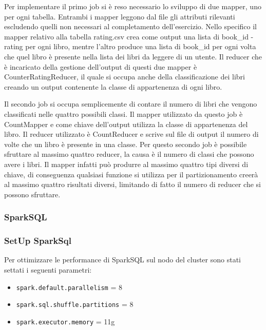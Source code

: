 Per implementare il primo job si è reso necessario lo sviluppo di due mapper, uno per ogni tabella.
Entrambi i mapper leggono dal file gli attributi rilevanti escludendo quelli non necessari al completamento dell'esercizio.
Nello specifico il mapper relativo alla tabella rating.csv crea come output una lista di book\_id - rating per ogni libro, mentre l'altro
produce una lista di book\_id per ogni volta che quel libro è presente nella lista dei libri da leggere di un utente.
Il reducer che è incaricato della gestione dell'output di questi due mapper è CounterRatingReducer, il quale si occupa anche della classificazione dei
libri creando un output contenente la classe di appartenenza di ogni libro.

Il secondo job si occupa semplicemente di contare il numero di libri che vengono classificati nelle quattro possibili classi.
Il mapper utilizzato da questo job è CountMapper e come chiave dell'output utilizza la classe di appartenenza del libro.
Il reducer utilizzato è CountReducer e scrive sul file di output il numero di volte che un libro è presente in una classe.
Per questo secondo job è possibile sfruttare al massimo quattro reducer, la causa è il numero di classi che possono avere i libri.
Il mapper infatti può produrre al massimo quattro tipi diversi di chiave, di conseguenza qualsiasi funzione si utilizza per il partizionamento
creerà al massimo quattro risultati diversi, limitando di fatto il numero di reducer che si possono sfruttare.


\subsubsection{SparkSQL}

\subsubsection{SetUp SparkSql}
Per ottimizzare le performance di SparkSQL sul nodo del cluster sono stati settati i seguenti parametri:
\begin{itemize}
    \item \texttt{spark.default.parallelism} = 8
    \item \texttt{spark.sql.shuffle.partitions} = 8
    \item \texttt{spark.executor.memory} = 11g
\end{itemize}

